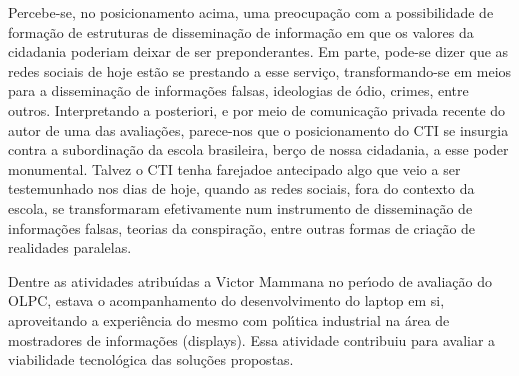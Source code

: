 \documentclass[
12pt,		%
openright,	%
twoside,  %
a4paper,			%
chapter=TITLE,		%
english,			%
french,				%
spanish,			%
brazil				%
]{USPSC-classe/USPSC}
\begin{document}
Percebe-se, no posicionamento acima, uma preocupa\c{c}\~ao com a possibilidade de forma\c{c}\~ao de estruturas de dissemina\c{c}\~ao de informa\c{c}\~ao em que os valores da cidadania poderiam deixar de ser preponderantes. Em parte, pode-se dizer que as redes sociais de hoje est\~ao se prestando a esse servi\c{c}o, transformando-se em meios para a dissemina\c{c}\~ao de informa\c{c}\~oes falsas, ideologias de \'odio, crimes, entre outros. Interpretando a posteriori, e por meio de comunica\c{c}\~ao privada recente do autor de uma das avalia\c{c}\~oes, parece-nos que o posicionamento do CTI se insurgia contra a subordina\c{c}\~ao da escola brasileira, ber\c{c}o de nossa cidadania, a esse poder monumental. Talvez o CTI tenha \textquotedbl farejado\textquotedbl  e antecipado algo que veio a ser testemunhado nos dias de hoje, quando as redes sociais, fora do contexto da escola, se transformaram efetivamente num instrumento de dissemina\c{c}\~ao de informa\c{c}\~oes falsas, teorias da conspira\c{c}\~ao, entre outras formas de cria\c{c}\~ao de realidades paralelas.

















Dentre as atividades atribu\'{\i}das a Victor Mammana no per\'{\i}odo de avalia\c{c}\~ao do OLPC, estava o acompanhamento do desenvolvimento do laptop em si, aproveitando a experi\^encia do mesmo com pol\'{\i}tica industrial na \'area de mostradores de informa\c{c}\~oes (displays). Essa atividade contribuiu para avaliar a viabilidade tecnol\'ogica das solu\c{c}\~oes propostas.
\end{document}
